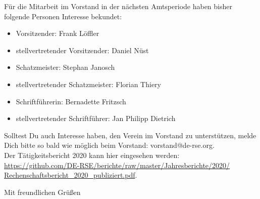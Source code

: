 \documentclass[../Vorlagen/de-RSE_Brief,a4paper,addrfield=no]{scrlttr2}
\begin{document}
\begin{letter}{\mbox{}
}
\clearpage
Für die Mitarbeit im Vorstand in der nächsten Amtsperiode haben bisher folgende Personen Interesse bekundet:
\begin{itemize}
 \item Vorsitzender: Frank Löffler
 \item stellvertretender Vorsitzender: Daniel Nüst
 \item Schatzmeister: Stephan Janosch
 \item stellvertretender Schatzmeister: Florian Thiery
 \item Schriftführerin: Bernadette Fritzsch
 \item stellvertretender Schriftführer: Jan Philipp Dietrich
\end{itemize}
Solltest Du auch Interesse haben, den Verein im Vorstand zu unterstützen, melde Dich bitte so bald wie möglich beim Vorstand: vorstand@de-rse.org.\\

Der Tätigkeitsbericht 2020 kann hier eingesehen werden:\\

\href{https://github.com/DE-RSE/berichte/raw/master/Jahresberichte/2020/Rechenschaftsbericht_2020_publiziert.pdf}{https://github.com/DE-RSE/berichte/raw/master/Jahresberichte/2020/\\Rechenschaftsbericht\_2020\_publiziert.pdf}.

\closing{Mit freundlichen Grüßen}
\end{letter}
\end{document}
